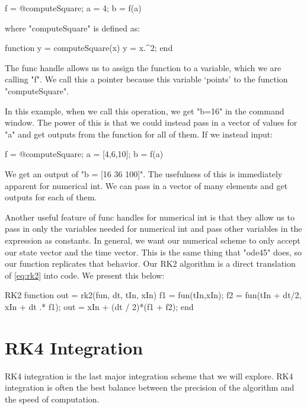\documentclass[10pt, openany, titlepage]{book}
\theoremstyle{definition}
\newcounter{example}[chapter]
\begin{document}
\begin{matlabscript}{}
f = @computeSquare;
a = 4;
b = f(a)
\end{matlabscript}
where "computeSquare" is defined as:
\begin{matlabscript}{}
function y = computeSquare(x)
y = x.^2;
end
\end{matlabscript}

The \gls{func handle} allows us to assign the function to a variable, which we are calling "f". We call this a pointer because this variable ‘points’ to the function "computeSquare".

In this example, when we call this operation, we get "b=16" in the command window. The power of this is that we could instead pass in a vector of values for "a" and get outputs from the function for all of them. If we instead input:

\begin{matlabscript}{}
f = @computeSquare;
a = [4,6,10];
b = f(a)
\end{matlabscript}

We get an output of "b = [16  36  100]". The usefulness of this is immediately apparent for \gls{numerical int}. We can pass in a vector of many elements and get outputs for each of them. 

Another useful feature of \glspl{func handle} for \gls{numerical int} is that they allow us to pass in only the variables needed for \gls{numerical int} and pass other variables in the expression as constants. In general, we want our numerical scheme to only accept our \gls{state vector} and the time vector. This is the same thing that "ode45" does, so our function replicates that behavior. Our RK2 algorithm is a direct translation of \eqref{eq:rk2} into code. We present this below:

\begin{matlabscript}{RK2}
function out = rk2(fun, dt, tIn, xIn)
    f1 = fun(tIn,xIn);
    f2 = fun(tIn + dt/2, xIn + dt .* f1);
    out = xIn + (dt / 2)*(f1 + f2);
end
\end{matlabscript}


\section{RK4 Integration}\label{sec: rk4}
RK4 integration is the last major integration scheme that we will explore. RK4 integration is often the best balance between the precision of the algorithm and the speed of computation. 
\end{document}
